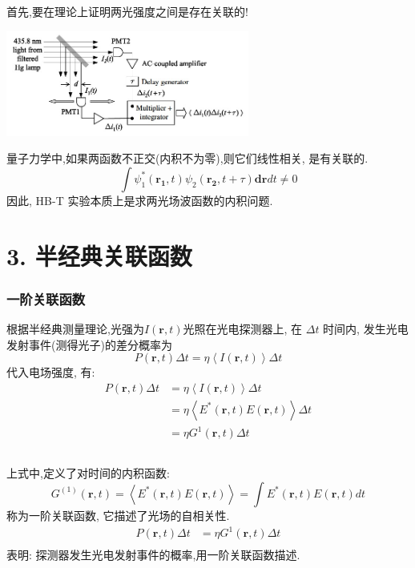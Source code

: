 \begin{frame} 
 \frametitle{}
    首先,要在理论上证明两光强度之间是存在关联的!   
    \begin{center}
        \includegraphics[width=0.6\textwidth]{figs/2022-05-08-13-20-54.png}
   \end{center}
   量子力学中,如果两函数不正交(内积不为零),则它们线性相关, 是有关联的.
   \[ \int \psi^*_1(\mathbf{r_1},t) \psi_2(\mathbf{r_2},t+ \tau) \mathbf{dr}dt \not = 0 \]
因此, HB-T 实验本质上是求两光场波函数的内积问题.
\end{frame}

\section{3. 半经典关联函数}

 \begin{frame} 
  \frametitle{一阶关联函数}
  根据半经典测量理论,光强为$I(\mathbf{r},t)$光照在光电探测器上, 在 $\Delta t $ 时间内, 发生光电发射事件(测得光子)的差分概率为 
\[  P (\mathbf{r},t) \Delta t = \eta \left\langle I(\mathbf{r},t) \right\rangle \Delta t \]  
代入电场强度, 有:   
\[ \begin{aligned}
    P (\mathbf{r},t) \Delta t &= \eta \left\langle I(\mathbf{r},t) \right\rangle \Delta t \\ 
    & = \eta \left\langle E^* (\mathbf{r},t) E (\mathbf{r},t)\right\rangle \Delta t \\
    &=\eta G^{1} (\mathbf{r},t) \Delta t  \\
\end{aligned}\] 
 \end{frame}

 \begin{frame} 
  \frametitle{}
  上式中,定义了对时间的内积函数:
\[ \boxed{ G^{(1)} (\mathbf{r},t) = \left\langle E^* (\mathbf{r},t) E (\mathbf{r},t)\right\rangle} = \int E^* (\mathbf{r},t) E (\mathbf{r},t) dt \]
  称为一阶关联函数, 它描述了光场的自相关性.\\ 
  \[ \begin{aligned}
    P (\mathbf{r},t) \Delta t &=\eta G^{1} (\mathbf{r},t) \Delta t  \\
   \end{aligned}\] 
   表明: 探测器发生光电发射事件的概率,用一阶关联函数描述. 
 \end{frame}

